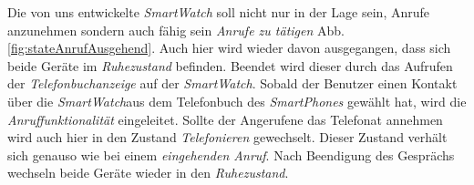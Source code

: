 Die von uns entwickelte \textit{SmartWatch} soll nicht nur in der Lage sein, Anrufe anzunehmen sondern auch fähig sein \textit{Anrufe zu tätigen} Abb. \ref{fig:stateAnrufAusgehend}. Auch hier wird wieder davon ausgegangen, dass sich beide Geräte im \textit{Ruhezustand} befinden. Beendet wird dieser durch das Aufrufen der \textit{Telefonbuchanzeige} auf der \textit{SmartWatch}. Sobald der Benutzer einen Kontakt über die \textit{SmartWatch}aus dem Telefonbuch des \textit{SmartPhones} gewählt hat, wird die \textit{Anruffunktionalität} eingeleitet. Sollte der Angerufene das Telefonat annehmen wird auch hier in den Zustand \textit{Telefonieren} gewechselt. Dieser Zustand verhält sich genauso wie bei einem \textit{eingehenden Anruf}. Nach Beendigung des Gesprächs wechseln beide Geräte wieder in den \textit{Ruhezustand}.